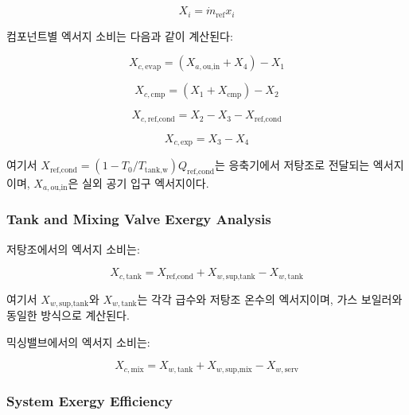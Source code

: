 \documentclass[final,5p,times,twocolumn,authoryear]{elsarticle}
\begin{document}
\begin{equation}
\label{eq:hpb_X_i}
X_i = \dot{m}_{\text{ref}} x_i
\end{equation}

컴포넌트별 엑서지 소비는 다음과 같이 계산된다:

\begin{equation}
\label{eq:hpb_xc_evap}
X_{c,\text{evap}} = (X_{a,\text{ou,in}} + X_4) - X_1
\end{equation}

\begin{equation}
\label{eq:hpb_xc_cmp}
X_{c,\text{cmp}} = (X_1 + X_{\text{cmp}}) - X_2
\end{equation}

\begin{equation}
\label{eq:hpb_xc_ref_cond}
X_{c,\text{ref,cond}} = X_2 - X_3 - X_{\text{ref,cond}}
\end{equation}

\begin{equation}
\label{eq:hpb_xc_exp}
X_{c,\text{exp}} = X_3 - X_4
\end{equation}

여기서 $X_{\text{ref,cond}} = (1 - T_0 / T_{\text{tank,w}}) Q_{\text{ref,cond}}$는 응축기에서 저탕조로 전달되는 엑서지이며, $X_{a,\text{ou,in}}$은 실외 공기 입구 엑서지이다.

\subsubsection{Tank and Mixing Valve Exergy Analysis}

저탕조에서의 엑서지 소비는:

\begin{equation}
\label{eq:hpb_xc_tank}
X_{c,\text{tank}} = X_{\text{ref,cond}} + X_{w,\text{sup,tank}} - X_{w,\text{tank}}
\end{equation}

여기서 $X_{w,\text{sup,tank}}$와 $X_{w,\text{tank}}$는 각각 급수와 저탕조 온수의 엑서지이며, 가스 보일러와 동일한 방식으로 계산된다.

믹싱밸브에서의 엑서지 소비는:

\begin{equation}
\label{eq:hpb_xc_mix}
X_{c,\text{mix}} = X_{w,\text{tank}} + X_{w,\text{sup,mix}} - X_{w,\text{serv}}
\end{equation}

\subsubsection{System Exergy Efficiency}
\end{document}
